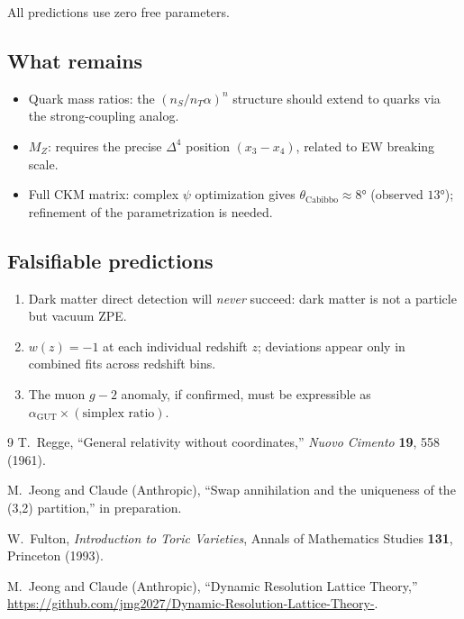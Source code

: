 \documentclass[12pt,a4paper]{article}
\newcommand{\agut}{\alpha_{\mathrm{GUT}}}
\newcommand{\nS}{n_S}
\newcommand{\nT}{n_T}
\begin{document}
All predictions use zero free parameters.

\subsection{What remains}

\begin{itemize}
\item Quark mass ratios: the $(\nS/\nT\alpha)^n$ structure
should extend to quarks via the strong-coupling analog.
\item $M_Z$: requires the precise $\Delta^4$ position
$(x_3 - x_4)$, related to EW breaking scale.
\item Full CKM matrix: complex $\psi$ optimization gives
$\theta_{\mathrm{Cabibbo}} \approx 8°$ (observed $13°$);
refinement of the parametrization is needed.
\end{itemize}

\subsection{Falsifiable predictions}

\begin{enumerate}
\item Dark matter direct detection will \emph{never} succeed:
dark matter is not a particle but vacuum ZPE.
\item $w(z) = -1$ at each individual redshift $z$; deviations
appear only in combined fits across redshift bins.
\item The muon $g-2$ anomaly, if confirmed, must be expressible
as $\agut \times (\text{simplex ratio})$.
\end{enumerate}

\begin{thebibliography}{9}
T.~Regge, ``General relativity without coordinates,''
\textit{Nuovo Cimento} \textbf{19}, 558 (1961).

M.~Jeong and Claude (Anthropic), ``Swap annihilation and the
uniqueness of the (3,2) partition,'' in preparation.

W.~Fulton, \textit{Introduction to Toric Varieties},
Annals of Mathematics Studies \textbf{131}, Princeton (1993).

M.~Jeong and Claude (Anthropic), ``Dynamic Resolution Lattice
Theory,'' \url{https://github.com/jmg2027/Dynamic-Resolution-Lattice-Theory-}.
\end{thebibliography}
\end{document}
